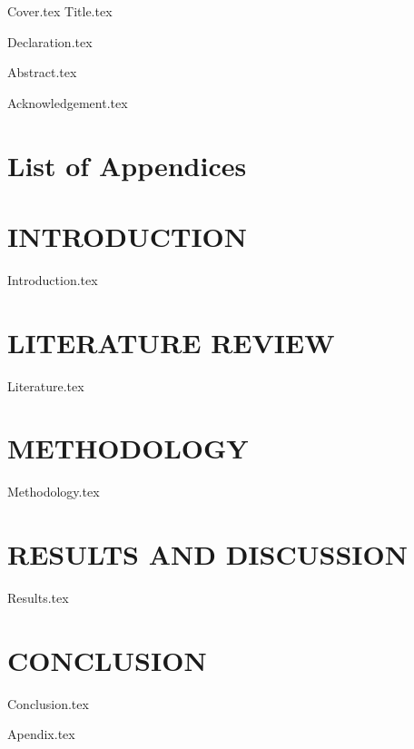 \documentclass[a4paper,12pt]{report}
\makeatletter
\renewcommand{\headrulewidth}{0pt}
\theoremstyle{definition}
\theoremstyle{definition}
\theoremstyle{definition}
\theoremstyle{definition}
\theoremstyle{definition}
\newcommand\listappendixname{List of Appendices}
\newcommand\listofappendices{%
   \chapter*{\listappendixname}\@starttoc{app}}
\makeatother
\begin{document}
{Cover.tex}
\thispagestyle{empty}
\newpage
{Title.tex}
\thispagestyle{empty}

\fancyhf{}
\chead{\thepage}
\renewcommand\headrulewidth{0pt}
\setcounter{page}{1}
{Declaration.tex}%
\newpage

{Abstract.tex}
\newpage


{Acknowledgement.tex}
\newpage
\thispagestyle{fancy}
\setcounter{tocdepth}{2}
\tableofcontents\thispagestyle{fancy}\singlespacing
\newpage



\listoftables\thispagestyle{fancy}\singlespacing
\newpage

\listoffigures\thispagestyle{fancy}\singlespacing
\newpage

\listofappendices\thispagestyle{fancy}\singlespacing



\chapter{INTRODUCTION}\onehalfspacing
\fancyhf{}
\cfoot{\thepage}
\renewcommand\footrulewidth{0pt}
{Introduction.tex}

\chapter{LITERATURE REVIEW}
{Literature.tex}

\chapter{METHODOLOGY}
{Methodology.tex}

\chapter{RESULTS AND DISCUSSION}
{Results.tex}


\chapter{CONCLUSION}
{Conclusion.tex}
\newpage
\singlespacing
{}
\printbibliography
\newpage

{Apendix.tex}
\end{document}

